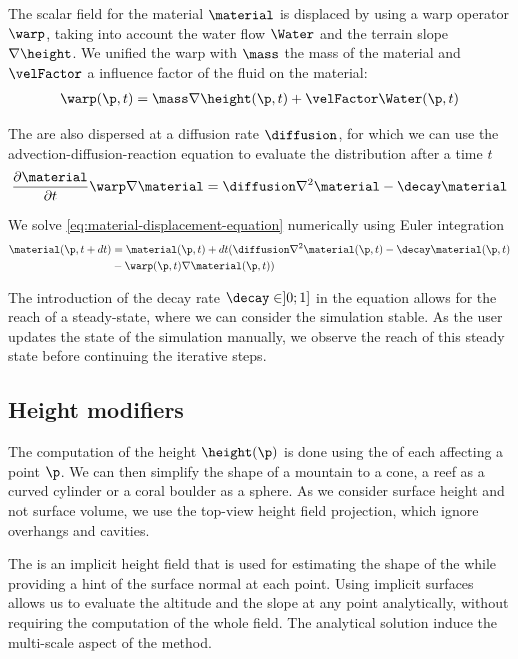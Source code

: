 The scalar field for the material $\material$ is displaced by using a warp operator $\warp$, taking into account the water flow $\Water$ and the terrain slope $\nabla \height$. We unified the warp with $\mass$ the mass of the material and $\velFactor$ a influence factor of the fluid on the material: 
\begin{align*}
    \warp(\p, t) = \mass \nabla \height(\p, t) + \velFactor \Water(\p, t)
\end{align*}
 
The  are also dispersed at a diffusion rate $\diffusion$, for which we can use the advection-diffusion-reaction equation to evaluate the distribution after a time $t$
\begin{align} 
	\label{eq:material-displacement-equation}
    \frac{\partial \material}{\partial t} \warp \nabla \material = \diffusion \nabla^2 \material - \decay \material
\end{align}

We solve \eqref{eq:material-displacement-equation} numerically using Euler integration
\begin{align}
    \material(\p, t + dt) &= \material(\p, t) + dt ( \diffusion \nabla^2 \material(\p, t) - \decay \material(\p, t) \\ & - \warp(\p, t) \nabla \material(\p, t) ) \nonumber
\end{align}

The introduction of the decay rate $\decay \in ]0; 1]$ in the equation allows for the reach of a steady-state, where we can consider the simulation stable. As the user updates the state of the simulation manually, we observe the reach of this steady state before continuing the iterative steps.

\subsection{Height modifiers}
The computation of the height $\height(\p)$ is done using the  of each  affecting a point $\p$. We can then simplify the shape of a mountain to a cone, a reef as a curved cylinder or a coral boulder as a sphere. As we consider surface height and not surface volume, we use the top-view height field projection, which ignore overhangs and cavities.

The  is an implicit height field that is used for estimating the shape of the  while providing a hint of the surface normal at each point. Using implicit surfaces allows us to evaluate the altitude and the slope at any point analytically, without requiring the computation of the whole field. The analytical solution induce the multi-scale aspect of the method. 


